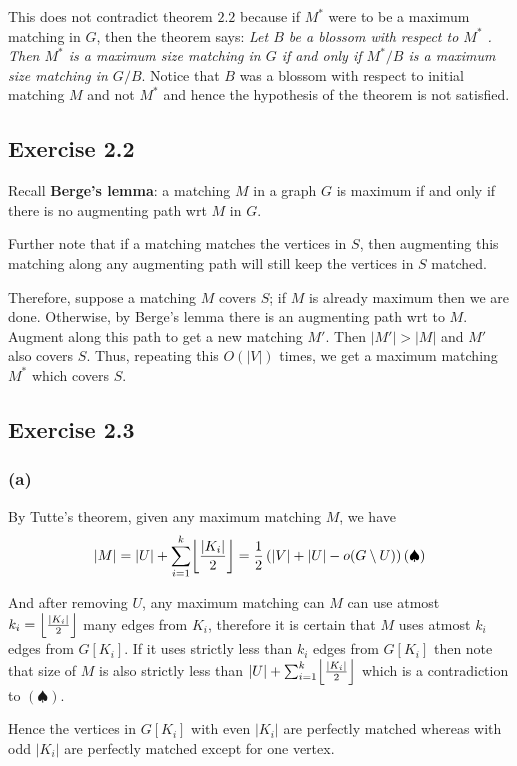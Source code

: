 \documentclass[12pt]{article}
\DeclarePairedDelimiter\floor{\lfloor}{\rfloor}
\begin{document}
This does not contradict theorem $2.2$ because if $M^*$ were to be a maximum matching in $G$, then the theorem says: \textsl{Let $B$ be a blossom with respect to $M^*$ . Then $M^*$ is a maximum size matching in $G$ if and only if $M^*/B$ is a maximum size matching in $G/B$}. Notice that $B$ was a blossom with respect to initial matching $M$ and not $M^*$ and hence the hypothesis of the theorem is not satisfied.

\subsection*{Exercise 2.2}

Recall \textbf{Berge's lemma}: a matching $M$ in a graph $G$ is maximum if and only if there is no augmenting path wrt $M$ in $G$.

Further note that if a matching matches the vertices in $S$, then augmenting this matching along any augmenting path will still keep the vertices in $S$ matched.

Therefore, suppose a matching $M$ covers $S$; if $M$ is already maximum then we are done. Otherwise, by Berge's lemma there is an augmenting path wrt to $M$. Augment along this path to get a new matching $M'$. Then $|M'| > |M|$ and $M'$ also covers $S$. Thus, repeating this $O(|V|)$ times, we get a maximum matching $M^*$ which covers $S$.

\subsection*{Exercise 2.3}

\subsubsection*{(a)}
By Tutte's theorem, given any maximum matching $M$, we have
$$|M| = |U| + \sum_{i=1}^k \floor*{\frac{|K_i|}{2}} = \frac{1}{2}\left(|V| + |U| - o(G \setminus U)\right) (\spadesuit)$$

And after removing $U$, any maximum matching can $M$ can use atmost $k_i = \floor*{\frac{|K_i|}{2}}$ many edges from $K_i$, therefore it is certain that $M$ uses atmost $k_i$ edges from $G[K_i]$. If it uses strictly less than $k_i$ edges from $G[K_i]$ then note that size of $M$ is also strictly less than $|U| + \sum_{i=1}^k \floor*{\frac{|K_i|}{2}}$ which is a contradiction to $(\spadesuit)$.

Hence the vertices in $G[K_i]$ with even $|K_i|$ are perfectly matched whereas with odd $|K_i|$ are perfectly matched except for one vertex.
\end{document}
